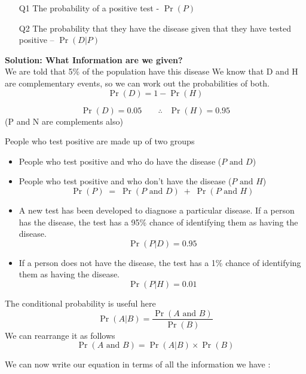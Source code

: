 \documentclass[]{article}
\begin{document}
	\begin{itemize}
		\item[Q1] The probability of a positive test - $\Pr(P)$
		\item[Q2] The probability that they have the disease given that they have tested positive – $\Pr(D|P)$
	\end{itemize}
	
	\noindent \textbf{Solution: What Information are we given?}\\
	
	\noindent We are told that 5\% of the population have this disease 
	We know that D and H are complementary events, so we can work out the probabilities of both. 
	\[\Pr(D) = 1-\Pr(H)\]
	
	
	\[  \Pr(D) = 0.05 \;\;\; \;\;\;\;  \therefore\;\;\ \Pr(H) = 0.95\]
	(P and N are complements also)\\ \smallskip
	
	
	\noindent People who test positive are made up of two groups
	\begin{itemize}
		\item People who test positive and who do have the disease  ($P \mbox{ and } D$)
		\item People who test positive and who don’t have the disease  ($P \mbox{ and } H$)
		\[\Pr(P) \; =  \;\Pr(P \mbox{ and } D) \; +  \;\Pr(P \mbox{ and } H)\]
		
	\end{itemize}
	\smallskip
	
	\begin{itemize}
		\item A new test has been developed to diagnose a particular disease. If a person has the disease, the test has a 95\% chance of identifying them as having the disease. 
		\[ \Pr(P|D) = 0.95\]
		
		\item If a person does not have the disease, the test has a 1\% chance of identifying them as having the disease. 
		\[ \Pr(P|H) = 0.01\]
	\end{itemize}	
	
	\begin{framed}
		\noindent The conditional probability is useful here		 
		{
			\large
			\[ \Pr(A | B) = \frac{\Pr(A \mbox{ and } B)}{\Pr(B)} \]
		}
		\noindent We can rearrange it as follows 		 
		{
			\large
			\[ \Pr(A \mbox{ and } B) =  \Pr(A|B) \times \Pr(B) \]
		}
	\end{framed}
	\medskip
	\noindent We can now write our equation in terms of all the information we have :
	
\end{document}
